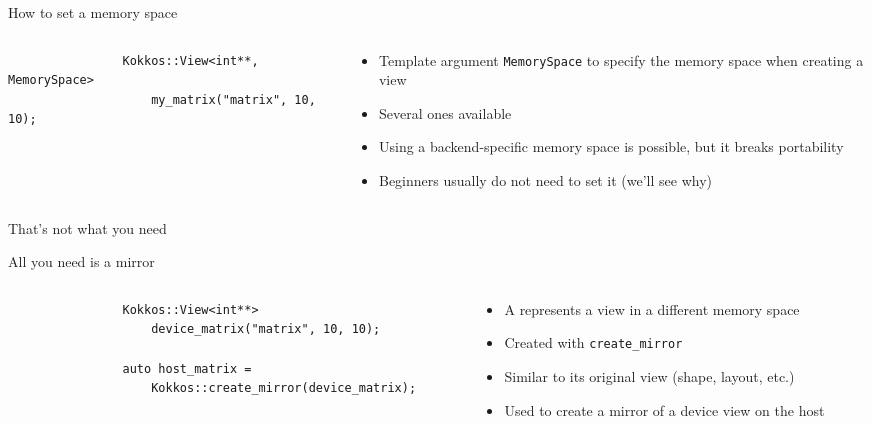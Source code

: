 \documentclass[aspectratio=169]{beamer}
\begin{document}

\begin{frame}[fragile]{How to set a memory space}
    \begin{columns}
        \begin{column}{0.5\linewidth}
            \begin{verbatim}
                Kokkos::View<int**, MemorySpace>
                    my_matrix("matrix", 10, 10);
            \end{verbatim}
        \end{column}
        \begin{column}{0.5\linewidth}
            \begin{itemize}
                \item Template argument \texttt{MemorySpace} to specify the memory space when creating a view
                \item Several ones available
                \item Using a backend-specific memory space is possible, but it breaks portability
                \item Beginners usually do not need to set it (we'll see why)
            \end{itemize}
        \end{column}
    \end{columns}

     That's not what you need
\end{frame}


\begin{frame}[fragile]{All you need is a mirror}
    \begin{columns}
        \begin{column}{0.6\linewidth}
            \begin{verbatim}
                Kokkos::View<int**>
                    device_matrix("matrix", 10, 10);

                auto host_matrix =
                    Kokkos::create_mirror(device_matrix);
            \end{verbatim}

        \end{column}
        \begin{column}{0.4\linewidth}
            \begin{itemize}
                \item A  represents a view in a different memory space
                \item Created with \texttt{create\_mirror}
                \item Similar to its original view (shape, layout, etc.)
                \item Used to create a mirror of a device view on the host
            \end{itemize}
        \end{column}
    \end{columns}
\end{frame}
\end{document}
